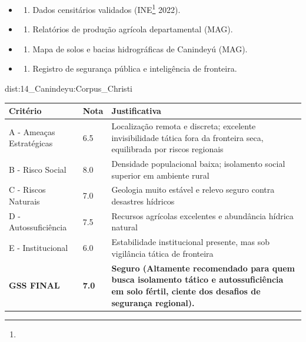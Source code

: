{\begin{itemize}
\tightlist
\item
  \begin{enumerate}
  \def\labelenumi{\arabic{enumi})}
  \tightlist
  \item
    Dados censitários validados (INE\footnote{\fineINE} 2022).
  \end{enumerate}
\item
  \begin{enumerate}
  \def\labelenumi{\arabic{enumi})}
  \setcounter{enumi}{1}
  \tightlist
  \item
    Relatórios de produção agrícola departamental (MAG).
  \end{enumerate}
\item
  \begin{enumerate}
  \def\labelenumi{\arabic{enumi})}
  \setcounter{enumi}{2}
  \tightlist
  \item
    Mapa de solos e bacias hidrográficas de Canindeyú (MAG).
  \end{enumerate}
\item
  \begin{enumerate}
  \def\labelenumi{\arabic{enumi})}
  \setcounter{enumi}{3}
  \tightlist
  \item
    Registro de segurança pública e inteligência de fronteira.
  \end{enumerate}
\end{itemize}}{dist:14_Canindeyu:Corpus_Christi}
\begin{table}[ht!]
\small \begin{tabular}{p{3.0cm}p{0.8cm}p{6.0cm}} \toprule
\textbf{Critério} & \textbf{Nota} & \textbf{Justificativa} \\ \midrule
A - Ameaças Estratégicas & 6.5 & Localização remota e discreta; excelente invisibilidade tática fora da fronteira seca, equilibrada por riscos regionais \\
B - Risco Social & 8.0 & Densidade populacional baixa; isolamento social superior em ambiente rural \\
C - Riscos Naturais & 7.0 & Geologia muito estável e relevo seguro contra desastres hídricos \\
D - Autossuficiência & 7.5 & Recursos agrícolas excelentes e abundância hídrica natural \\
E - Institucional & 6.0 & Estabilidade institucional presente, mas sob vigilância tática de fronteira \\
\midrule \textbf{GSS FINAL} & \textbf{7.0} & \textbf{Seguro (Altamente recomendado para quem busca isolamento tático e autossuficiência em solo fértil, ciente dos desafios de segurança regional).} \\ \bottomrule \end{tabular}
\end{table}
